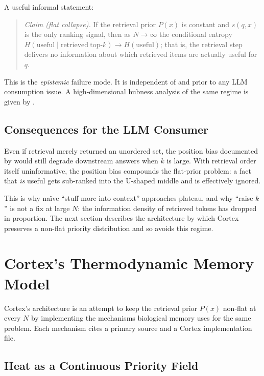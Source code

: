 \documentclass[11pt]{article}
\begin{document}
A useful informal statement:
\begin{quote}
\emph{Claim (flat collapse).}  If the retrieval prior $P(x)$ is
constant and $s(q, x)$ is the only ranking signal, then as
$N \to \infty$ the conditional entropy
$H(\mathrm{useful} \mid \mathrm{retrieved\ top}\text{-}k) \to H(\mathrm{useful})$;
that is, the retrieval step delivers no information about which
retrieved items are actually useful for $q$.
\end{quote}

This is the \emph{epistemic} failure mode.  It is independent of
and prior to any LLM consumption issue.  A high-dimensional
hubness analysis of the same regime is given by
\citet{Radovanovic2010}.

\subsection{Consequences for the LLM Consumer}
\label{sec:flat-consumer}

Even if retrieval merely returned an unordered set, the position
bias documented by \citet{Liu2023} would still degrade downstream
answers when $k$ is large.  With retrieval order itself
uninformative, the position bias compounds the flat-prior problem:
a fact that \emph{is} useful gets sub-ranked into the U-shaped
middle and is effectively ignored.

This is why na\"{i}ve ``stuff more into context'' approaches plateau,
and why ``raise $k$'' is not a fix at large $N$: the information
density of retrieved tokens has dropped in proportion.  The next
section describes the architecture by which Cortex preserves a
non-flat priority distribution and so avoids this regime.

\section{Cortex's Thermodynamic Memory Model}
\label{sec:thermodynamic}

Cortex's architecture is an attempt to keep the retrieval prior
$P(x)$ non-flat at every $N$ by implementing the mechanisms
biological memory uses for the same problem.  Each mechanism cites
a primary source and a Cortex implementation file.

\subsection{Heat as a Continuous Priority Field}
\label{sec:heat}
\end{document}
